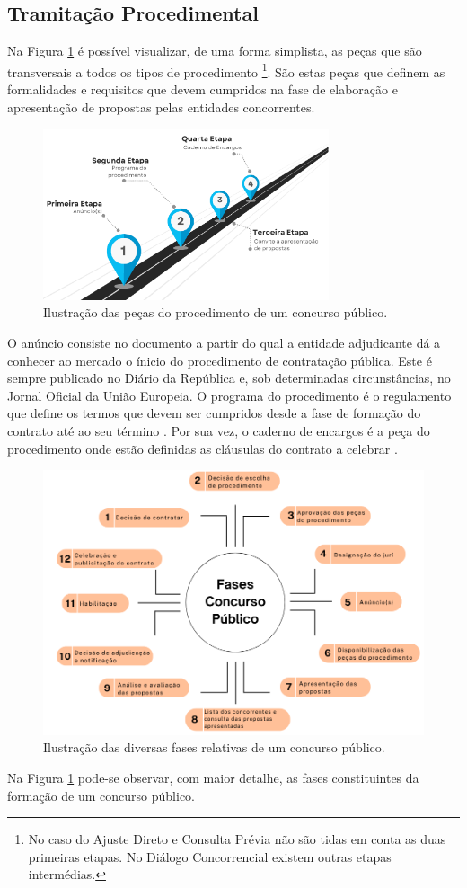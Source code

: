 \subsection{Tramitação Procedimental}

Na Figura \ref{fig:pecas} é possível visualizar, de uma forma simplista, as peças que são transversais a todos os tipos de procedimento \footnote{No caso do Ajuste Direto e Consulta Prévia não são tidas em conta as duas primeiras etapas. No Diálogo Concorrencial existem outras etapas intermédias.}. 
São estas peças que definem as formalidades e requisitos que devem cumpridos na fase de elaboração e apresentação de propostas pelas entidades concorrentes. 

\begin{figure}[H]
	\centering
	\includegraphics[width=0.75\textwidth]{imagens/pecasprocedimento.png}
	\caption{Ilustração das peças do procedimento de um concurso público.}
	\label{fig:pecas}
\end{figure}


O anúncio consiste no documento a partir do qual a entidade adjudicante dá a conhecer ao mercado o ínicio do procedimento de contratação pública. Este é sempre publicado no Diário da República e, sob determinadas circunstâncias, no Jornal Oficial da União Europeia. 
O programa do procedimento é o regulamento que define os termos que devem ser cumpridos desde a fase de formação do contrato até ao seu término \cite{programaproc}. 
Por sua vez, o caderno de encargos é a peça do procedimento onde estão definidas as cláusulas do contrato a celebrar \cite{caderno}. 


\begin{figure}[H]
	\centering
	\includegraphics[width=.8\textwidth]{imagens/fasesconcpub.png}
	\caption{Ilustração das diversas fases relativas de um concurso público.}
	\label{fig:fasescp}
\end{figure}

Na Figura \ref{fig:pecas} pode-se observar, com maior detalhe, as fases constituintes da formação de um concurso público. 

